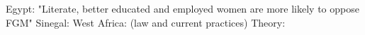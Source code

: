 \documentclass[12pt,]{article}
\begin{document}
Egypt:  "Literate, better educated and employed women are more likely to oppose FGM" \cite{VanMeek15}
Sinegal: \cite{KandComb15}
West Africa:  \cite{SipsChen12} (law and current practices)
Theory:  


\end{document}
